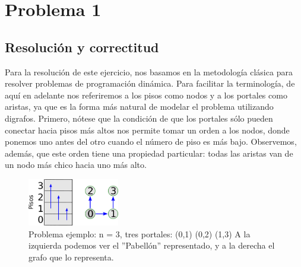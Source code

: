 \documentclass{article}
\theoremstyle{definition}
\theoremstyle{remark}
\begin{document}
{} %

\subtitulo{}
\grupo{}

 
\maketitle

\pagebreak

\tableofcontents

\pagebreak


\section{Problema 1}

\subsection{Resolución y correctitud}

Para la resolución de este ejercicio, nos basamos en la metodología clásica para resolver problemas de programación dinámica. Para facilitar la terminología, de aquí en adelante nos referiremos a los pisos como nodos y a los portales como aristas, ya que es la forma más natural de modelar el problema utilizando digrafos. Primero, nótese que la condición de que los portales sólo pueden conectar hacia pisos más altos nos permite tomar un orden a los nodos, donde ponemos uno antes del otro cuando el número de piso es más bajo. Observemos, además, que este orden tiene una propiedad particular: todas las aristas van de un nodo más chico hacia uno más alto.

\begin{figure}
    \centering
        \includegraphics[width=4cm]{images/ej1/example.png}

    
    \caption{Problema ejemplo: n = 3, tres portales: (0,1) (0,2) (1,3)
    A la izquierda podemos ver el ''Pabellón'' representado, y a la derecha el grafo que lo representa.\label{grf:ex1-example}}
\end{figure}
\end{document}
